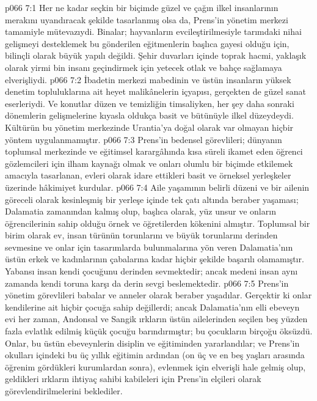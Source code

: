 \vs p066 7:1 Her ne kadar seçkin bir biçimde güzel ve çağın ilkel insanlarının merakını uyandıracak şekilde tasarlanmış olsa da, Prens’in yönetim merkezi tamamiyle mütevazıydi. Binalar; hayvanların evcileştirilmesiyle tarımdaki nihai gelişmeyi desteklemek bu gönderilen eğitmenlerin başlıca gayesi olduğu için, bilinçli olarak büyük yapılı değildi. Şehir duvarları içinde toprak hacmi, yaklaşık olarak yirmi bin insanı geçindirmek için yetecek otlak ve bahçe sağlamaya elverişliydi.
\vs p066 7:2 İbadetin merkezi mabedinin ve üstün insanların yüksek denetim topluluklarına ait heyet malikânelerin içyapısı, gerçekten de güzel sanat eserleriydi. Ve konutlar düzen ve temizliğin timsaliyken, her şey daha sonraki dönemlerin gelişmelerine kıyasla oldukça basit ve bütünüyle ilkel düzeydeydi. Kültürün bu yönetim merkezinde Urantia’ya doğal olarak var olmayan hiçbir yöntem uygulanmamıştır.
\vs p066 7:3 Prens’in bedensel görevlileri; dünyanın toplumsal merkezinde ve eğitimsel karargâhında kısa süreli ikamet eden öğrenci gözlemcileri için ilham kaynağı olmak ve onları olumlu bir biçimde etkilemek amacıyla tasarlanan, evleri olarak idare ettikleri basit ve örneksel yerleşkeler üzerinde hâkimiyet kurdular.
\vs p066 7:4 Aile yaşamının belirli düzeni ve bir ailenin göreceli olarak kesinleşmiş bir yerleşe içinde tek çatı altında beraber yaşaması; Dalamatia zamanından kalmış olup, başlıca olarak, yüz unsur ve onların öğrencilerinin sahip olduğu örnek ve öğretilerden kökenini almıştır. Toplumsal bir birim olarak ev, insan türünün torunlarını ve büyük torunlarını derinden sevmesine ve onlar için tasarımlarda bulunmalarına yön veren Dalamatia’nın üstün erkek ve kadınlarının çabalarına kadar hiçbir şekilde başarılı olamamıştır. Yabansı insan kendi çocuğunu derinden sevmektedir; ancak medeni insan aynı zamanda kendi toruna karşı da derin sevgi beslemektedir.
\vs p066 7:5 Prens’in yönetim görevlileri babalar ve anneler olarak beraber yaşadılar. Gerçektir ki onlar kendilerine ait hiçbir çocuğa sahip değillerdi; ancak Dalamatia’nın elli ebeveyn evi her zaman, Andonsal ve Sangik ırkların üstün ailelerinden seçilen beş yüzden fazla evlatlık edilmiş küçük çocuğu barındırmıştır; bu çocukların birçoğu öksüzdü. Onlar, bu üstün ebeveynlerin disiplin ve eğitiminden yararlandılar; ve Prens’in okulları içindeki bu üç yıllık eğitimin ardından (on üç ve en beş yaşları arasında öğrenim gördükleri kurumlardan sonra), evlenmek için elverişli hale gelmiş olup, geldikleri ırkların ihtiyaç sahibi kabileleri için Prens’in elçileri olarak görevlendirilmelerini beklediler.
